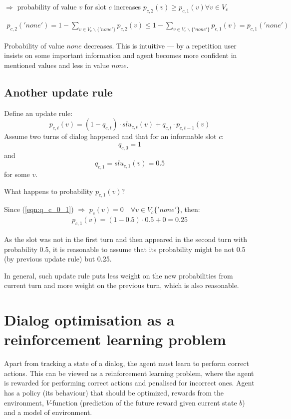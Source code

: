 \documentclass[12pt,titlepage,a4paper]{article}
\begin{document}
\noindent $\Rightarrow$ probability of value $v$  for slot $c$ increases $p_{c,2}(v) \geq p_{c,1}(v) \forall v \in V_c $

\begin{align*}
    p_{c,2}('none') = 1 - \sum_{v \in V_{c} \backslash \{'none'\}} p_{c,2}(v) \leq 1 - \sum_{v \in V_{c} \backslash \{'none'\}} p_{c,1}(v)  = p_{c,1}('none')
\end{align*}

\noindent Probability of value $none$ decreases.
This is intuitive --- by a repetition user insists on some important information and agent becomes more confident in mentioned values and less in value $none$.

\subsection{Another update rule}
Define an update rule:
\begin{equation}
    p_{c,t}(v) = (1-q_{c,t})\cdot slu_{c,t}(v) + q_{c,t} \cdot p_{c,t-1}(v)
\end{equation}
Assume two turns of dialog happened and that for an informable slot $c$:
\begin{equation}
    \label{eqn:q_c_0_1}
    q_{c, 0} = 1
\end{equation}
and 
\begin{equation}
    \label{eqn:q_c_1}
    q_{c, 1} = slu_{c,1}(v) = 0.5
\end{equation}
for some $v$.

What happens to probability $p_{c,1}(v)$?

Since (\ref{eqn:q_c_0_1}) $\Rightarrow$ $p_c(v) = 0  \quad \forall v \in V_c\{'none'\} $, then: 
\begin{align*}
    p_{c,1}(v) = (1 - 0.5) \cdot 0.5 + 0 = 0.25
\end{align*}

As the slot was not in the first turn and then appeared in the second turn with probability 0.5, it is reasonable to assume that its probability might be not 0.5 (by previous update rule) but 0.25. 

In general, such update rule puts less weight on the new probabilities from current turn and more weight on the previous turn, which is also reasonable. 

\newpage

\section{Dialog optimisation as a reinforcement learn\-ing problem}
Apart from tracking a state of a dialog, the agent must learn to perform correct actions. This can be viewed as a reinforcement learning problem, where the agent is rewarded for performing correct actions and penalised for incorrect ones. Agent has a policy (its behaviour) that should be optimized, rewards from the environment, $V$-function (prediction of the future reward given current state $b$) and a model of environment.
\end{document}
